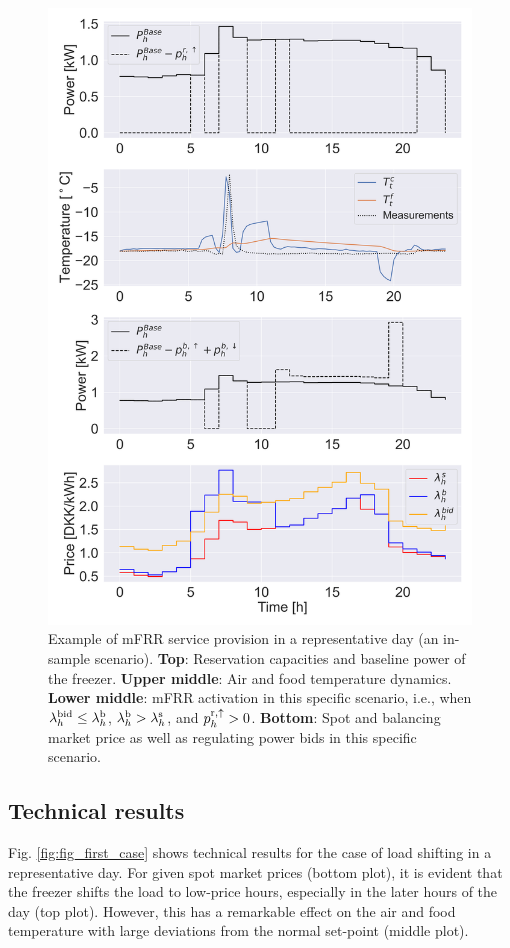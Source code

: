 \begin{figure}[t]
    \centering
    \includegraphics[width=\columnwidth]{../figures/mFRR_single_case.png}
    \caption{Example of mFRR service provision in a representative day (an in-sample scenario). \textbf{Top}: Reservation capacities and baseline power of the freezer. \textbf{Upper middle}: Air and food temperature dynamics. \textbf{Lower middle}: mFRR activation in this specific scenario, i.e., when $\lambda_{h}^{\rm{bid}} \leq \lambda_{h}^{\rm{b}}$, $\lambda_{h}^{\rm{b}} > \lambda_{h}^{\rm{s}}$, and $p^{\rm{r},\uparrow}_{h} > 0$. \textbf{Bottom}: Spot and balancing market price as well as regulating power bids in this specific scenario.}
    \label{fig:fig_second_case}
\end{figure}


\subsection{Technical results}
Fig. \ref{fig:fig_first_case} shows technical results for the case of load shifting in a representative day. For given spot market prices (bottom plot), it is evident that the freezer shifts the load to low-price hours, especially in the later hours of the day (top plot). However, this has a remarkable effect on the air and food temperature with large deviations from the normal set-point (middle plot).


